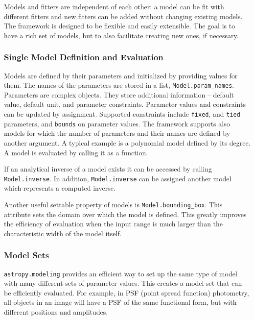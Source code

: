 \documentclass[modern]{aastex61}
\newcommand{\package}[1]{\texttt{#1}\xspace}
\begin{document}
Models and fitters are independent of each other: a model can be fit with different
fitters and new fitters can be added without changing existing models. The
framework is designed to be flexible and easily extensible. The goal is to have
a rich set of models, but to also facilitate creating new ones, if necessary.

\subsubsection{Single Model Definition and Evaluation}

Models are defined by their parameters and initialized by providing values for them. The
names of the parameters are stored in a list, \texttt{Model.param\_names}. Parameters are complex objects.
They store additional information -- default value, default unit, and parameter constraints. Parameter
values and constraints can be updated by assignment. Supported constraints include \texttt{fixed},
and \texttt{tied} parameters, and \texttt{bounds} on parameter values. The framework supports also models
for which the number of parameters and their names are defined by another argument.
A typical example is a polynomial model defined by its degree.
A model is evaluated by calling it as a function.

If an analytical inverse of a model exists it can be
accessed  by calling \texttt{Model.inverse}. In addition, \texttt{Model.inverse} can be assigned
another model which represents a computed inverse.

Another useful settable property of models is \texttt{Model.bounding\_box}. This attribute sets the domain over which the model is defined. This greatly improves the efficiency of evaluation when the input range is much larger than the characteristic width of the model itself.

\subsubsection{Model Sets}

\package{astropy.modeling} provides an efficient way to set up the same type of model with many different sets of parameter values.
This creates a model set that can be efficiently evaluated. For example, in PSF (point spread function) photometry, all objects in an image will have a PSF of the same functional form, but with different positions and amplitudes.
\end{document}

